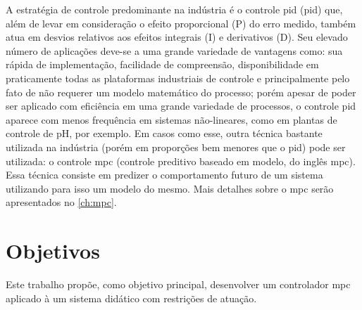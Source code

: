 A estratégia de controle predominante na indústria é o controle \acrshort{pid}
(\acrlong{pid}) que, além de levar em consideração o efeito proporcional (P) do erro
medido, também atua em desvios relativos aos efeitos integrais (I) e derivativos (D).
Seu elevado número de aplicações deve-se a uma grande variedade de vantagens como:
sua rápida de implementação, facilidade de compreensão, disponibilidade em praticamente
todas as plataformas industriais de controle e principalmente pelo fato de não requerer
um modelo matemático do processo; porém apesar de poder ser aplicado com eficiência em
uma grande variedade de processos, o controle \acrshort{pid} aparece com menos frequência
em sistemas não-lineares, como em plantas de controle de pH, por exemplo. Em casos como
esse, outra técnica bastante utilizada na indústria (porém em proporções bem menores
que o \acrshort{pid}) pode ser utilizada: o controle \acrshort{mpc} (controle preditivo
baseado em modelo, do inglês \acrlong{mpc}). Essa técnica consiste em predizer o
comportamento futuro de um sistema utilizando para isso um modelo do mesmo. Mais
detalhes sobre o \acrshort{mpc} serão apresentados no \cref{ch:mpc}.

\section{Objetivos}
\label{sec:objetivos}

Este trabalho propõe, como objetivo principal, desenvolver um controlador \acrshort{mpc}
aplicado à um sistema didático com restrições de atuação.


